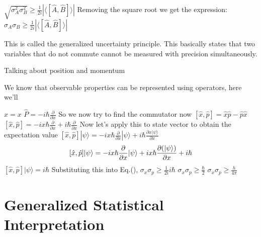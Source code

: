 $\sqrt{\sigma_{A}^{2}\sigma_{B}^{2}} \geq \frac{1}{2i} |\langle [\hat{A},\hat{B}] \rangle|$
Removing the square root we get the expression:
$\sigma_{A}\sigma_{B} \geq \frac{1}{2i} |\langle[\hat{A}, \hat{B}]\rangle|$

This is called the generalized uncertainty principle. This basically states that two variables that do not commute cannot be measured with precision simultaneously.

Talking about position and momentum

We know that observable properties can be represented using operators, here we'll 

$\hat{x} = x$
$\hat{P} = -i\hbar \frac{\partial}{\partial x}$
So we now try to find the commutator now
$[\hat{x}, \hat{p}] = \hat{x}\hat{p} - \hat{p}\hat{x}$
$[\hat{x}, \hat{p}] = -ix\hbar \frac{\partial}{\partial x} + i\hbar \frac{\partial}{\partial x}$
Now let's apply this to state vector to obtain the expectation value
$[\hat{x}, \hat{p}] |\psi\rangle = -ix\hbar \frac{\partial}{\partial x} |\psi\rangle + i\hbar \frac{\partial x|\psi\rangle}{\partial x}$
$$[\hat{x}, \hat{p}] |\psi\rangle = -ix\hbar \frac{\partial}{\partial x} |\psi\rangle + ix\hbar \pdv{(|\psi\rangle)}{x} + i\hbar$$
$[\hat{x}, \hat{p}] |\psi\rangle = i\hbar$
Substituting this into Eq.(),
$\sigma_{x}\sigma_{p} \geq \frac{1}{2i} i\hbar$
$\sigma_{x}\sigma_{p} \geq \frac{\hbar}{2}$ 
$\sigma_{x}\sigma_{p} \geq \frac{h}{4 \pi}$
\section{Generalized Statistical Interpretation}
